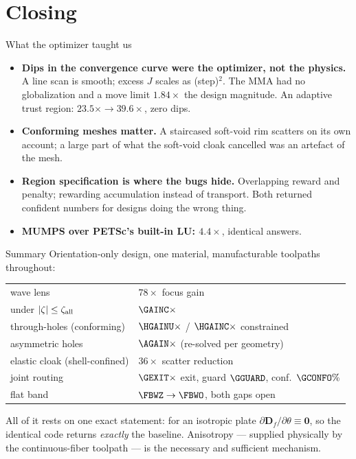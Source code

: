 \documentclass[aspectratio=169,10pt]{beamer}
\begin{document}
\section{Closing}

\begin{frame}{What the optimizer taught us}
\begin{itemize}
  \item \textbf{Dips in the convergence curve were the optimizer, not the physics.}
        A line scan is smooth; excess $J$ scales as (step)$^2$. The MMA had no
        globalization and a move limit $1.84\times$ the design magnitude.
        An adaptive trust region: $23.5\times\to39.6\times$, zero dips.
  \item \textbf{Conforming meshes matter.} A staircased soft-void rim scatters on
        its own account; a large part of what the soft-void cloak cancelled was
        an artefact of the mesh.
  \item \textbf{Region specification is where the bugs hide.} Overlapping reward
        and penalty; rewarding accumulation instead of transport. Both returned
        confident numbers for designs doing the wrong thing.
  \item \textbf{MUMPS over PETSc's built-in LU: $4.4\times$}, identical answers.
\end{itemize}
\end{frame}

\begin{frame}{Summary}
Orientation-only design, one material, manufacturable toolpaths throughout:
\begin{center}\small
\begin{tabular}{ll}
\toprule
wave lens                       & $78\times$ focus gain\\
\quad under $|\zeta|\le\zeta_{\rm all}$ & $\GAINC\times$\\
through-holes (conforming)      & $\HGAINU\times$ / $\HGAINC\times$ constrained\\
asymmetric holes                & $\AGAIN\times$ (re-solved per geometry)\\
elastic cloak (shell-confined)  & $36\times$ scatter reduction\\
joint routing                   & $\GEXIT\times$ exit, guard $\GGUARD$, conf.\ $\GCONFO\%$\\
flat band                       & $\FBWZ\to\FBWO$, both gaps open\\
\bottomrule
\end{tabular}
\end{center}
\vfill
All of it rests on one exact statement: for an isotropic plate
$\partial\mathbf D_f/\partial\theta\equiv\bm 0$, so the identical code returns
\emph{exactly} the baseline. Anisotropy --- supplied physically by the
continuous-fiber toolpath --- is the necessary and sufficient mechanism.
\end{frame}
\end{document}
